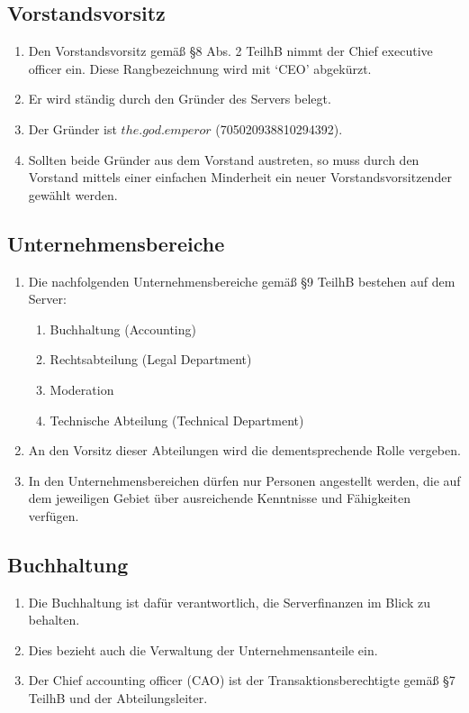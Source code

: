 \documentclass{article}
\begin{document}
\subsection{Vorstandsvorsitz}
\begin{enumerate}[(1)]
	\item Den Vorstandsvorsitz gemäß §8 Abs. 2 TeilhB nimmt der Chief executive officer ein. Diese Rangbezeichnung wird mit `CEO' abgekürzt.
	\item Er wird ständig durch den Gründer des Servers belegt.
	\item Der Gründer ist $the.god.emperor$ (705020938810294392).
	\item Sollten beide Gründer aus dem Vorstand austreten, so muss durch den Vorstand mittels einer einfachen Minderheit ein neuer Vorstandsvorsitzender gewählt werden.
\end{enumerate}

\subsection{Unternehmensbereiche}
\begin{enumerate}[(1)]
	\item Die nachfolgenden Unternehmensbereiche gemäß §9 TeilhB bestehen auf dem Server:
		\begin{enumerate}[1.]
			\item Buchhaltung (Accounting)
			\item Rechtsabteilung (Legal Department)
			\item Moderation
			\item Technische Abteilung (Technical Department)
		\end{enumerate}
	\item An den Vorsitz dieser Abteilungen wird die dementsprechende Rolle vergeben.
	\item In den Unternehmensbereichen dürfen nur Personen angestellt werden, die auf dem jeweiligen Gebiet über ausreichende Kenntnisse und Fähigkeiten verfügen.
\end{enumerate}

\subsection{Buchhaltung}
\begin{enumerate}[(1)]
	\item Die Buchhaltung ist dafür verantwortlich, die Serverfinanzen im Blick zu behalten.
	\item Dies bezieht auch die Verwaltung der Unternehmensanteile ein.
	\item Der Chief accounting officer (CAO) ist der Transaktionsberechtigte gemäß §7 TeilhB und der Abteilungsleiter.
\end{enumerate}
\end{document}
